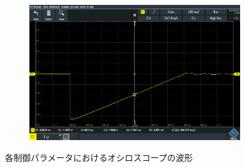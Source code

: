 \begin{figure}
\begin{subfigure}{0.48\columnwidth}
		\label{fig:oscilloscope-raw-p100-d80}
	\end{subfigure}
	\begin{subfigure}{0.48\columnwidth}
		\centering
		\includegraphics[width=0.8\linewidth]{src/figures/oscilloscope-raw/p100-d100.png}
		\label{fig:oscilloscope-raw-p100-d100}
	\end{subfigure}

	\caption{各制御パラメータにおけるオシロスコープの波形}\label{fig:oscilloscope-raw}
\end{figure}
